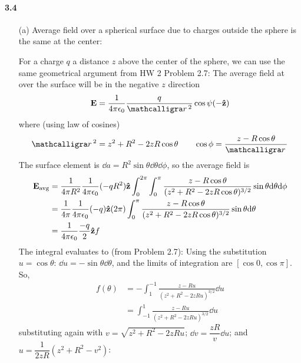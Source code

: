 \documentclass[../main.tex]{subfiles}
\begin{document}
\pagestyle{fancy}

\setcounter{section}{4}

\paragraph{3.4} 
\begin{enumerate}
    \item [(a)] Average field over a spherical surface due to charges outside the sphere is the same at the center:

    For a charge $q$ a distance $z$ above the center of the sphere, 
    we can use the same geometrical argument from HW 2 Problem 2.7:
    The average field at over the surface will be in the negative $z$ direction
    \begin{align*}
        \vb E = \ke \frac{q}{\scriptr^2} \cos\psi (-\vu z)
    \end{align*}
    where (using law of cosines)
    \begin{align*}
        \scriptr^2 = z^2 + R^2 - 2zR\cos\theta \qquad \cos\phi = \frac{z - R\cos\theta}{\scriptr}
    \end{align*}
    The surface element is $\dd a = R^2 \sin\theta \dd \theta \dd\phi$, so the average field is 
    \begin{align*}
        \vb E_\text{avg} &= \frac{1}{4\pi R^2} \frac{1}{4\pi\epsilon_0} (-qR^2) \vu z \int_0^{2\pi} \int_0^\pi \frac{z - R\cos\theta}{(z^2 + R^2 - 2zR\cos\theta)^{3/2}} \sin \theta \dd\theta \dd\phi \\
        &= \frac{1}{4\pi} \frac{1}{4\pi\epsilon_0} (-q) \vu z (2\pi) \int_0^\pi \frac{z - R\cos\theta}{(z^2 + R^2 - 2zR\cos\theta)^{3/2}} \sin \theta \dd\theta \\
        &= \frac{1}{4\pi\epsilon_0} \frac{-q}{2} \vu z f
    \end{align*}
    The integral evaluates to (from Problem 2.7):
    Using the substitution $u = \cos\theta$: $\dd{u} = -\sin\theta \dd{\theta}$, and the limits of
    integration are $[\cos{0}, \cos{\pi}]$. So,
    \begin{align*}
        f(\theta) &= -\int_{1}^{-1} \frac{z - Ru}{(z^2 + R^2 - 2zRu)^{3/2}} \dd{u} \\
        &= \int_{-1}^{1} \frac{z - Ru}{(z^2 + R^2 - 2zRu)^{3/2}} \dd{u}
    \end{align*}
    substituting again with $v = \sqrt{z^2 + R^2 - 2zRu}$; $\dd{v} = \dfrac{zR}{v} \dd{u}$; and $
    u = \dfrac{1}{2zR}(z^2 + R^2 - v^2)$:
    \begin{align*}

\end{align*}
\end{enumerate}
\end{document}
